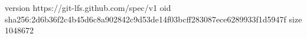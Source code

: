 version https://git-lfs.github.com/spec/v1
oid sha256:2d6b36f2c4b45d6c8a902842c9d53de14f03bcff283087ece6289933f1d5947f
size 1048672
